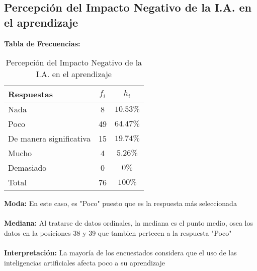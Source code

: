 \subsection{Percepción del Impacto Negativo de la I.A. en el aprendizaje}
\noindent\textbf{Tabla de Frecuencias:}

\begin{table}[h!]
	\centering
	\renewcommand{\arraystretch}{1.5}
	\begin{tabular}{l c c }
		\hline
		Respuestas & \(f_i\) & \(h_i\) \\
		\hline
		Nada & 8 & \(10.53\%\) \\
		Poco & 49 & \(64.47\%\) \\
		De manera significativa & 15 & \(19.74\%\) \\
		Mucho & 4 & \(5.26\%\) \\
		Demasiado & 0 & \(0\%\) \\
		\hline
		Total & 76 & \(100\%\) \\
		\hline
	\end{tabular}
	\caption{Percepción del Impacto Negativo de la I.A. en el aprendizaje}
	\label{tabla:percepciónNegativaEnElAprendizaje}
\end{table}

\noindent\textbf{Moda:} En este caso, es "Poco" puesto que es la respuesta más seleccionada \\ \\
\noindent\textbf{Mediana:} Al tratarse de datos ordinales, la mediana es el punto medio, osea los datos en la posiciones 38 y 39  que tambien pertecen a la respuesta "Poco" \\ \\
\noindent\textbf{Interpretación:} La mayoría de los encuestados considera que el uso de las inteligencias artificiales afecta poco a su aprendizaje